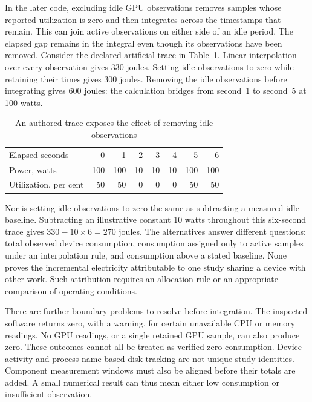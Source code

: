In the later code, excluding idle GPU observations removes samples whose
reported utilization is zero and then integrates across the timestamps that
remain. This can join active observations on either side of an idle period.
The elapsed gap remains in the integral even though its observations have
been removed. Consider the declared artificial trace in
Table~\ref{closure:energy-trace}. Linear interpolation over every observation
gives 330 joules. Setting idle observations to zero while retaining their
times gives 300 joules. Removing the idle observations before integrating
gives 600 joules: the calculation bridges from second~1 to second~5 at
100 watts.

\begin{table}[htbp]
\centering\small
\caption{An authored trace exposes the effect of removing idle observations}
\label{closure:energy-trace}
\begin{tabular}{lrrrrrrr}
\toprule
Elapsed seconds & 0&1&2&3&4&5&6\\
Power, watts &100&100&10&10&10&100&100\\
Utilization, per cent &50&50&0&0&0&50&50\\
\bottomrule
\end{tabular}
\end{table}

Nor is setting idle observations to zero the same as subtracting a measured
idle baseline. Subtracting an illustrative constant 10 watts throughout this
six-second trace gives $330-10\times6=270$ joules. The alternatives answer
different questions: total observed device consumption, consumption assigned
only to active samples under an interpolation rule, and consumption above
a stated baseline. None proves the incremental electricity attributable to
one study sharing a device with other work. Such attribution requires an
allocation rule or an appropriate comparison of operating conditions.

There are further boundary problems to resolve before integration. The
inspected software returns zero, with a warning, for certain unavailable
CPU or memory readings. No GPU readings, or a single retained GPU sample,
can also produce zero. These outcomes cannot all be treated as verified
zero consumption. Device activity and process-name-based disk tracking are
not unique study identities. Component measurement windows must also be
aligned before their totals are added. A small numerical result can thus
mean either low consumption or insufficient observation.

